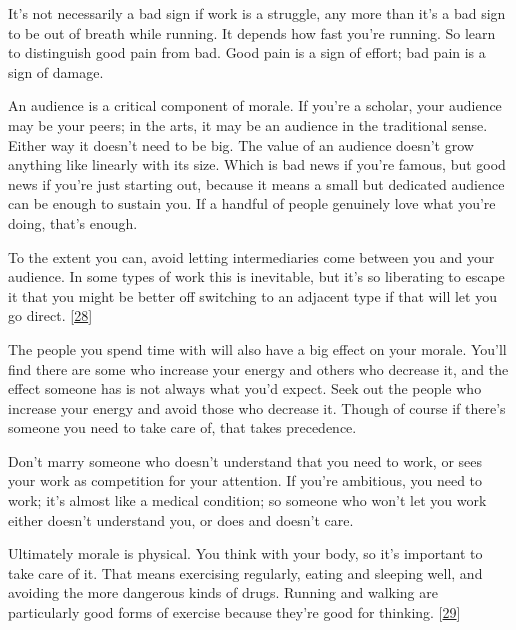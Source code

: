 It's
                  not necessarily a bad sign if work is a struggle, any more
                  than it's a bad sign to be out of breath while running. It
                  depends how fast you're running. So learn to distinguish good
                  pain from bad. Good pain is a sign of effort; bad pain is a
                  sign of damage.






                  An audience is a critical component of morale. If you're a
                  scholar, your audience may be your peers; in the arts, it may
                  be an audience in the traditional sense. Either way it doesn't
                  need to be big. The value of an audience doesn't grow anything
                  like linearly with its size. Which is bad news if you're
                  famous, but good news if you're just starting out, because it
                  means a small but dedicated audience can be enough to sustain
                  you. If a handful of people genuinely love what you're doing,
                  that's enough.

To the extent you can, avoid letting
                  intermediaries come between you and your audience. In some
                  types of work this is inevitable, but it's so liberating to
                  escape it that you might be better off switching to an
                  adjacent type if that will let you go direct.
                  [\href{\#f28n}{28}]

The people you spend time with will also have a
                  big effect on your morale. You'll find there are some who
                  increase your energy and others who decrease it, and the
                  effect someone has is not always what you'd expect. Seek out
                  the people who increase your energy and avoid those who
                  decrease it. Though of course if there's someone you need to
                  take care of, that takes precedence.

Don't marry
                  someone who doesn't understand that you need to work, or sees
                  your work as competition for your attention. If you're
                  ambitious, you need to work; it's almost like a medical
                  condition; so someone who won't let you work either doesn't
                  understand you, or does and doesn't care.

Ultimately
                  morale is physical. You think with your body, so it's
                  important to take care of it. That means exercising regularly,
                  eating and sleeping well, and avoiding the more dangerous
                  kinds of drugs. Running and walking are particularly good
                  forms of exercise because they're good for thinking.
                  [\href{\#f29n}{29}]

